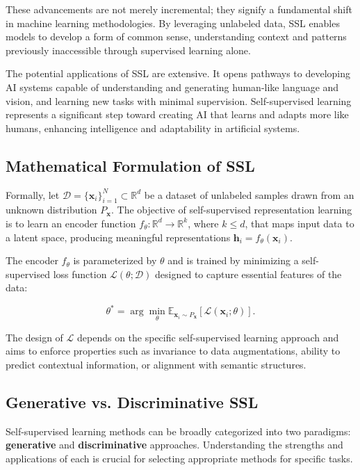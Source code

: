 These advancements are not merely incremental; they signify a fundamental shift in machine learning methodologies. By leveraging unlabeled data, SSL enables models to develop a form of common sense, understanding context and patterns previously inaccessible through supervised learning alone.

The potential applications of SSL are extensive. It opens pathways to developing AI systems capable of understanding and generating human-like language and vision, and learning new tasks with minimal supervision. Self-supervised learning represents a significant step toward creating AI that learns and adapts more like humans, enhancing intelligence and adaptability in artificial systems.



\subsection{Mathematical Formulation of SSL}

Formally, let \( \mathcal{D} = \{ \mathbf{x}_i \}_{i=1}^N \subset \mathbb{R}^d \) be a dataset of unlabeled samples drawn from an unknown distribution \( P_{\mathbf{x}} \). The objective of self-supervised representation learning is to learn an encoder function \( f_{\theta} : \mathbb{R}^d \rightarrow \mathbb{R}^k \), where \( k \leq d \), that maps input data to a latent space, producing meaningful representations \( \mathbf{h}_i = f_{\theta}(\mathbf{x}_i) \).

The encoder \( f_{\theta} \) is parameterized by \( \theta \) and is trained by minimizing a self-supervised loss function \( \mathcal{L}(\theta; \mathcal{D}) \) designed to capture essential features of the data:

\[
\theta^* = \arg \min_{\theta} \mathbb{E}_{\mathbf{x}_i \sim P_{\mathbf{x}}} [\mathcal{L}(\mathbf{x}_i; \theta)].
\]

The design of \( \mathcal{L} \) depends on the specific self-supervised learning approach and aims to enforce properties such as invariance to data augmentations, ability to predict contextual information, or alignment with semantic structures.

\subsection{Generative vs. Discriminative SSL}

Self-supervised learning methods can be broadly categorized into two paradigms: \textbf{generative} and \textbf{discriminative} approaches. Understanding the strengths and applications of each is crucial for selecting appropriate methods for specific tasks.

